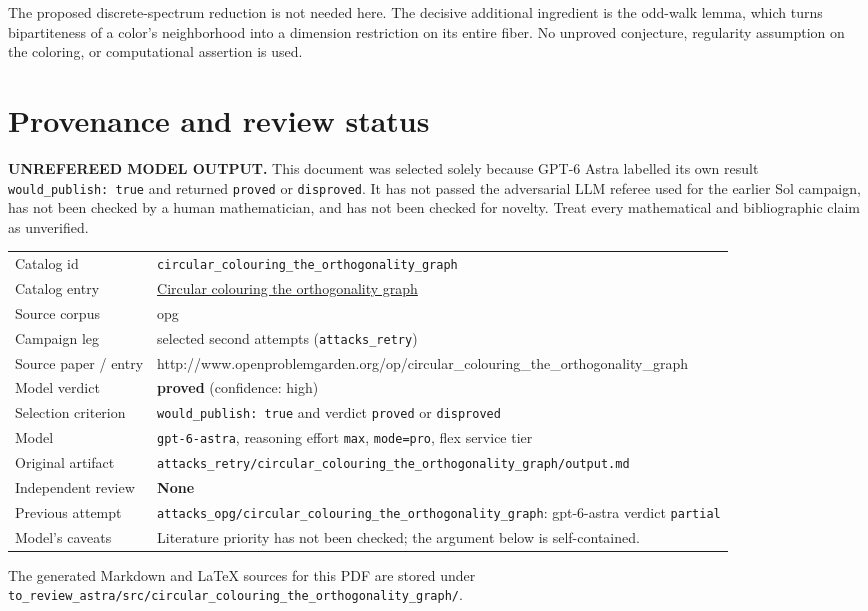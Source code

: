 \documentclass[
  11pt,
  a4paper,
]{article}
\newcounter{none} %
\begin{document}
The proposed discrete-spectrum reduction is not needed here. The
decisive additional ingredient is the odd-walk lemma, which turns
bipartiteness of a color's neighborhood into a dimension restriction on
its entire fiber. No unproved conjecture, regularity assumption on the
coloring, or computational assertion is used.

\appendix

\section{Provenance and review
status}\label{provenance-and-review-status}

\begin{warning}

\textbf{UNREFEREED MODEL OUTPUT.} This document was selected solely
because GPT-6 Astra labelled its own result
\texttt{would\_publish:\ true} and returned \texttt{proved} or
\texttt{disproved}. It has not passed the adversarial LLM referee used
for the earlier Sol campaign, has not been checked by a human
mathematician, and has not been checked for novelty. Treat every
mathematical and bibliographic claim as unverified.

\end{warning}

{\def\LTcaptype{none} %
\begin{longtable}[]{@{}
  >{\raggedright\arraybackslash}p{}
  >{\raggedright\arraybackslash}p{}@{}}
\toprule\noalign{}
\endhead
\bottomrule\noalign{}
\endlastfoot
Catalog id & \texttt{circular\_colouring\_the\_orthogonality\_graph} \\
Catalog entry &
\href{https://graph-theory-ai.github.io/graph-conjectures/op/circular_colouring_the_orthogonality_graph/}{Circular
colouring the orthogonality graph} \\
Source corpus & opg \\
Campaign leg & selected second attempts (\texttt{attacks\_retry}) \\
Source paper / entry &
http://www.openproblemgarden.org/op/circular\_colouring\_the\_orthogonality\_graph \\
Model verdict & \textbf{proved} (confidence: high) \\
Selection criterion & \texttt{would\_publish:\ true} and verdict
\texttt{proved} or \texttt{disproved} \\
Model & \texttt{gpt-6-astra}, reasoning effort \texttt{max},
\texttt{mode=pro}, flex service tier \\
Original artifact &
\texttt{attacks\_retry/circular\_colouring\_the\_orthogonality\_graph/output.md} \\
Independent review & \textbf{None} \\
Previous attempt &
\texttt{attacks\_opg/circular\_colouring\_the\_orthogonality\_graph}:
gpt-6-astra verdict \texttt{partial} \\
Model's caveats & Literature priority has not been checked; the argument
below is self-contained. \\
\end{longtable}
}

The generated Markdown and LaTeX sources for this PDF are stored under
\texttt{to\_review\_astra/src/circular\_colouring\_the\_orthogonality\_graph/}.
\end{document}
